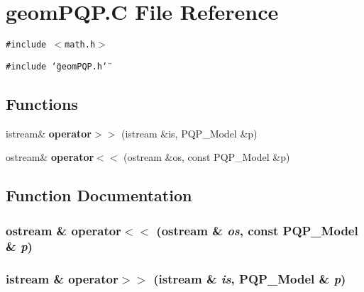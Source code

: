 \section{geom\-PQP.C File Reference}
\label{geomPQP_8C}
{\tt \#include $<$math.h$>$}\par
{\tt \#include \char`\"{}geom\-PQP.h\char`\"{}}\par
\subsection*{Functions}
\begin{CompactItemize}
\item 
istream\& {\bf operator$>$$>$} (istream \&is, PQP\_\-Model \&p)
\item 
ostream\& {\bf operator$<$$<$} (ostream \&os, const PQP\_\-Model \&p)
\end{CompactItemize}


\subsection{Function Documentation}
\subsubsection{\setlength{\rightskip}{0pt plus 5cm}ostream \& operator$<$$<$ (ostream \& {\em os}, const PQP\_\-Model \& {\em p})}\label{geomPQP_8C_a1}


\subsubsection{\setlength{\rightskip}{0pt plus 5cm}istream \& operator$>$$>$ (istream \& {\em is}, PQP\_\-Model \& {\em p})}\label{geomPQP_8C_a0}


